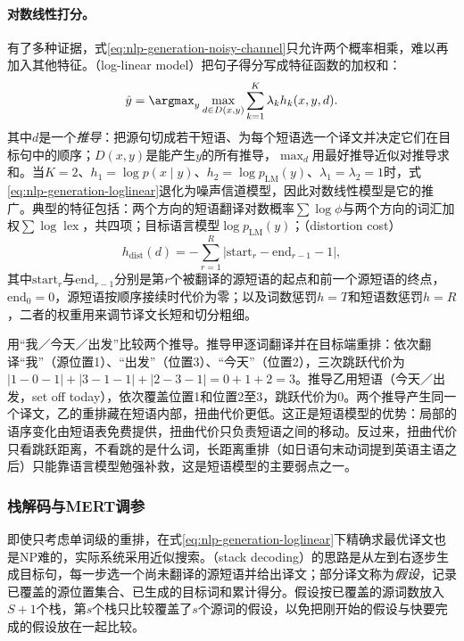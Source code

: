 \paragraph{对数线性打分。}有了多种证据，式\eqref{eq:nlp-generation-noisy-channel}只允许两个概率相乘，难以再加入其他特征。（log-linear model）把句子得分写成特征函数的加权和\cite{nlp-gen-och2002loglinear}：
\begin{equation}
  \hat y=\argmax_{y}\max_{d\in D(x,y)}\sum_{k=1}^{K}\lambda_k h_k(x,y,d).
  \label{eq:nlp-generation-loglinear}
\end{equation}
其中$d$是一个\emph{推导}：把源句切成若干短语、为每个短语选一个译文并决定它们在目标句中的顺序；$D(x,y)$是能产生$y$的所有推导，$\max_d$用最好推导近似对推导求和。当$K=2$、$h_1=\log p(x\mid y)$、$h_2=\log p_{\mathrm{LM}}(y)$、$\lambda_1=\lambda_2=1$时，式\eqref{eq:nlp-generation-loglinear}退化为噪声信道模型，因此对数线性模型是它的推广。典型的特征包括：两个方向的短语翻译对数概率$\sum\log\phi$与两个方向的词汇加权$\sum\log\operatorname{lex}$，共四项；目标语言模型$\log p_{\mathrm{LM}}(y)$；（distortion cost）
\begin{equation}
  h_{\mathrm{dist}}(d)=-\sum_{r=1}^{R}\bigl|\mathrm{start}_r-\mathrm{end}_{r-1}-1\bigr|,
  \label{eq:nlp-generation-distortion}
\end{equation}
其中$\mathrm{start}_r$与$\mathrm{end}_{r-1}$分别是第$r$个被翻译的源短语的起点和前一个源短语的终点，$\mathrm{end}_0=0$，源短语按顺序接续时代价为零；以及词数惩罚$h=T$和短语数惩罚$h=R$，二者的权重用来调节译文长短和切分粗细。

用“我／今天／出发”比较两个推导。推导甲逐词翻译并在目标端重排：依次翻译“我”（源位置1）、“出发”（位置3）、“今天”（位置2），三次跳跃代价为$|1-0-1|+|3-1-1|+|2-3-1|=0+1+2=3$。推导乙用短语（今天／出发，set off today），依次覆盖位置1和位置2至3，跳跃代价为0。两个推导产生同一个译文，乙的重排藏在短语内部，扭曲代价更低。这正是短语模型的优势：局部的语序变化由短语表免费提供，扭曲代价只负责短语之间的移动。反过来，扭曲代价只看跳跃距离，不看跳的是什么词，长距离重排（如日语句末动词提到英语主语之后）只能靠语言模型勉强补救，这是短语模型的主要弱点之一。

\subsubsection{栈解码与MERT调参}
\label{sec:nlp-generation-stack-mert}

即使只考虑单词级的重排，在式\eqref{eq:nlp-generation-loglinear}下精确求最优译文也是NP难的\cite{nlp-gen-knight1999decoding}，实际系统采用近似搜索。（stack decoding）的思路是从左到右逐步生成目标句，每一步选一个尚未翻译的源短语并给出译文；部分译文称为\emph{假设}，记录已覆盖的源位置集合、已生成的目标词和累计得分。假设按已覆盖的源词数放入$S+1$个栈，第$s$个栈只比较覆盖了$s$个源词的假设，以免把刚开始的假设与快要完成的假设放在一起比较。

